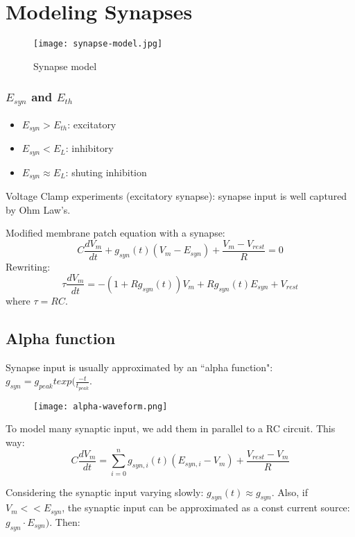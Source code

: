 \documentclass[main]{subfiles}
\begin{document}

\section{Modeling Synapses}


\begin{figure}[H]
	\centering
 	\texttt{[image: synapse-model.jpg]}
 	\caption{Synapse model}
 	\label{fig:synapse-model}
\end{figure}

\subsubsection{$E_{syn}$ and $E_{th}$}
\begin{itemize}
\item $E_{syn} > E_{th}$: excitatory
\item $E_{syn} < E_{L}$: inhibitory
\item $E_{syn} \approx E_{L}$: shuting inhibition
\end{itemize}

Voltage Clamp experiments (excitatory synapse): synapse input is well captured by Ohm Law's.

Modified membrane patch equation with a synapse:
\[ C \frac{dV_m}{dt} + g_{syn}(t)(V_m - E_{syn}) + \frac{V_m - V_{rest}}{R} = 0 \]
Rewriting:
\[ \tau \frac{dV_m}{dt} = -(1 + R g_{syn}(t)) V_m + R g_{syn}(t) E_{syn} + V_{rest} \]
where $\tau = RC$.

\subsection{Alpha function}
Synapse input is usually approximated by an ``alpha function": $g_{syn} = g_{peak} t exp(\frac{-t}{t_{peak}}$.

\begin{figure}[H]
	\centering
 	\texttt{[image: alpha-waveform.png]}
\end{figure} 

To model many synaptic input, we add them in parallel to a RC circuit. This way:
\[ C \frac{dV_m}{dt} = \sum_{i=0}^{n} g_{syn, i}(t) (E_{syn, i} - V_m) + \frac{V_{rest} -V_m}{R} \]

Considering the synaptic input varying slowly: $g_{syn}(t) \approx g_{syn}$. Also, if $V_m << E_{syn}$, the synaptic input can be approximated as a const current source: $g_{syn} \cdot E_{syn})$. Then:
\end{document}
